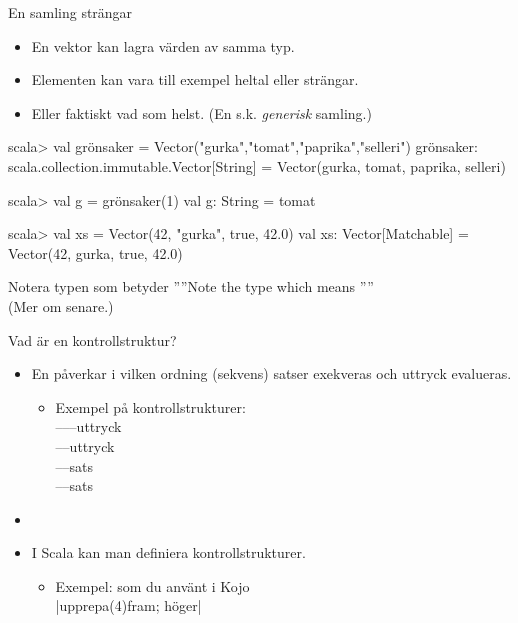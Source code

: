 \begin{Slide}{En samling strängar}

\begin{itemize}
\item En vektor kan lagra  värden av samma typ.
\item Elementen kan vara till exempel heltal eller strängar.
\item Eller faktiskt vad som helst. (En s.k. \emph{generisk} samling.)
\end{itemize}

\begin{REPL}
scala> val grönsaker = Vector("gurka","tomat","paprika","selleri")
grönsaker: scala.collection.immutable.Vector[String] =
  Vector(gurka, tomat, paprika, selleri)

scala> val g = grönsaker(1)
val g: String = tomat

scala> val xs = Vector(42, "gurka", true, 42.0)
val xs: Vector[Matchable] = Vector(42, gurka, true, 42.0)
\end{REPL}
\SlideFontSmall \ifswedish Notera typen  som betyder ''''\else Note the type  which means ''''\fi\\
(Mer om  senare.)
\end{Slide}





\begin{Slide}{Vad är en kontrollstruktur?}
\begin{itemize}
\item En  påverkar i vilken ordning (sekvens) satser exekveras och uttryck evalueras.
\begin{itemize}
\item[] Exempel på  kontrollstrukturer:
\\\vspace{0.5em}------uttryck
\\----uttryck
\\----sats 
\\----sats 
\end{itemize}

\item[]

\item I Scala kan man definiera  kontrollstrukturer.
\begin{itemize}
\item[] Exempel:  som du använt i Kojo
\\\vspace{0.5em}\code|upprepa(4){fram; höger}|
\end{itemize}
\end{itemize}
\end{Slide}

